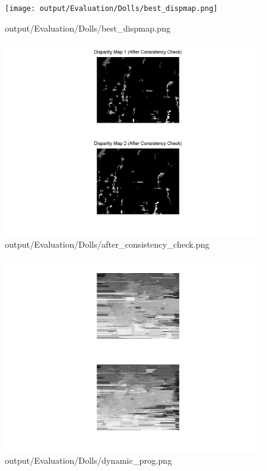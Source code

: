 \begin{figure}[h]    \texttt{[image: output/Evaluation/Dolls/best\_dispmap.png]}    \caption{output/Evaluation/Dolls/best\_dispmap.png}\end{figure}
\begin{figure}[h]    \includegraphics[scale=0.5]{output/Evaluation/Dolls/after_consistency_check.png}    \caption{output/Evaluation/Dolls/after\_consistency\_check.png}\end{figure}
\begin{figure}[h]    \includegraphics[scale=0.5]{output/Evaluation/Dolls/dynamic_prog.png}    \caption{output/Evaluation/Dolls/dynamic\_prog.png}\end{figure}
